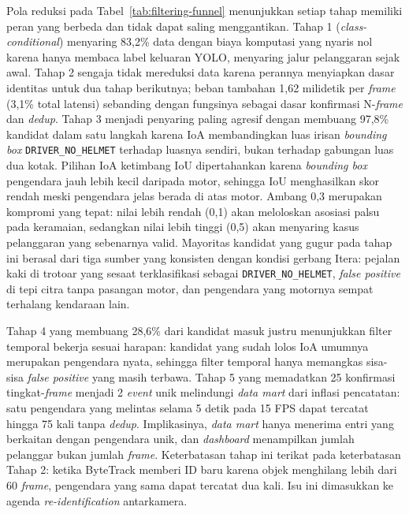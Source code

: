 Pola reduksi pada Tabel~\ref{tab:filtering-funnel} menunjukkan setiap tahap memiliki peran yang berbeda dan tidak dapat saling menggantikan. Tahap 1 (\textit{class-conditional}) menyaring 83,2\% data dengan biaya komputasi yang nyaris nol karena hanya membaca label keluaran YOLO, menyaring jalur pelanggaran sejak awal. Tahap 2 sengaja tidak mereduksi data karena perannya menyiapkan dasar identitas untuk dua tahap berikutnya; beban tambahan 1,62 milidetik per \textit{frame} (3,1\% total latensi) sebanding dengan fungsinya sebagai dasar konfirmasi N-\textit{frame} dan \textit{dedup}. Tahap 3 menjadi penyaring paling agresif dengan membuang 97,8\% kandidat dalam satu langkah karena IoA membandingkan luas irisan \textit{bounding box} \texttt{DRIVER\_NO\_HELMET} terhadap luasnya sendiri, bukan terhadap gabungan luas dua kotak. Pilihan IoA ketimbang IoU dipertahankan karena \textit{bounding box} pengendara jauh lebih kecil daripada motor, sehingga IoU menghasilkan skor rendah meski pengendara jelas berada di atas motor. Ambang 0,3 merupakan kompromi yang tepat: nilai lebih rendah (0,1) akan meloloskan asosiasi palsu pada keramaian, sedangkan nilai lebih tinggi (0,5) akan menyaring kasus pelanggaran yang sebenarnya valid. Mayoritas kandidat yang gugur pada tahap ini berasal dari tiga sumber yang konsisten dengan kondisi gerbang Itera: pejalan kaki di trotoar yang sesaat terklasifikasi sebagai \texttt{DRIVER\_NO\_HELMET}, \textit{false positive} di tepi citra tanpa pasangan motor, dan pengendara yang motornya sempat terhalang kendaraan lain.

Tahap 4 yang membuang 28,6\% dari kandidat masuk justru menunjukkan filter temporal bekerja sesuai harapan: kandidat yang sudah lolos IoA umumnya merupakan pengendara nyata, sehingga filter temporal hanya memangkas sisa-sisa \textit{false positive} yang masih terbawa. Tahap 5 yang memadatkan 25 konfirmasi tingkat-\textit{frame} menjadi 2 \textit{event} unik melindungi \textit{data mart} dari inflasi pencatatan: satu pengendara yang melintas selama 5 detik pada 15 FPS dapat tercatat hingga 75 kali tanpa \textit{dedup}. Implikasinya, \textit{data mart} hanya menerima entri yang berkaitan dengan pengendara unik, dan \textit{dashboard} menampilkan jumlah pelanggar bukan jumlah \textit{frame}. Keterbatasan tahap ini terikat pada keterbatasan Tahap 2: ketika ByteTrack memberi ID baru karena objek menghilang lebih dari 60 \textit{frame}, pengendara yang sama dapat tercatat dua kali. Isu ini dimasukkan ke agenda \textit{re-identification} antarkamera.

